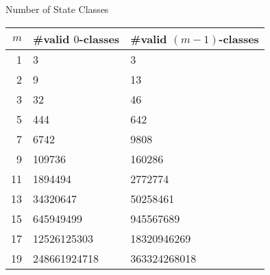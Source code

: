 \documentclass{prosper}
\newtheorem{lemma}{\sc Lemma}
\newenvironment{proof}{\par \sc Proof.\rm}{\hspace*{\fill}$\bullet$\vspace{1ex}}
\newcommand{\my}[2]{{#1 \choose #2}}
\begin{document}
%
%
%
%
\begin{slide}{Number of State Classes}
\begin{table}
\begin{tabular}{|r|l|l|}
\hline
$m$ & \#valid $0$-classes & \#valid $(m-1)$-classes \\ \hline
1   & 3 & 3 \\
2   & 9 & 13 \\
3   & 32 & 46 \\
5   & 444 & 642 \\
7   & 6742 & 9808 \\
9   & 109736 & 160286 \\
11  & 1894494 & 2772774 \\
13  & 34320647 & 50258461 \\
15  & 645949499 & 945567689 \\
17  & 12526125303 & 18320946269 \\
19  & 248661924718 & 363324268018 \\
\hline
\end{tabular}
\label{borderstates}
\end{table}
\end{slide}%
\end{document}
